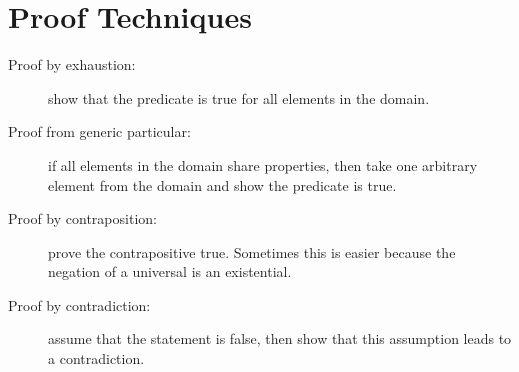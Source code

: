 \documentclass[11pt]{article}
\begin{document}
\section{Proof Techniques}
	\begin{description}
		\item[Proof by exhaustion:] show that the predicate is true for all elements in the domain.
		\item[Proof from generic particular:] if all elements in the domain share properties, then take one arbitrary element from the domain and show the predicate is true.
		\item[Proof by contraposition:] prove the contrapositive true. Sometimes this is easier because the negation of a universal is an existential.
		\item[Proof by contradiction:] assume that the statement is false, then show that this assumption leads to a contradiction.
	\end{description}

%		
%		


\end{document}
